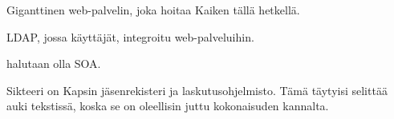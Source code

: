 Giganttinen web-palvelin, joka hoitaa Kaiken tällä hetkellä.

LDAP, jossa käyttäjät, integroitu web-palveluihin.

halutaan olla SOA.

Sikteeri on Kapsin jäsenrekisteri ja laskutusohjelmisto. Tämä täytyisi selittää auki tekstissä, koska se on oleellisin juttu kokonaisuden kannalta.